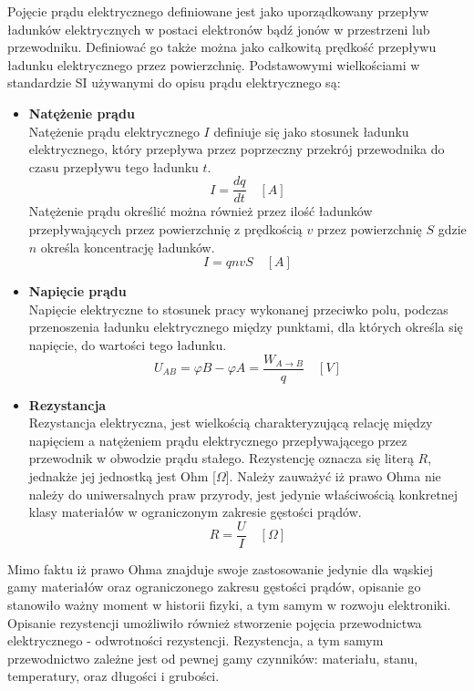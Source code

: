 \documentclass[,a4paper,12pt]{article}
\renewcommand{\cite}{\supercite}
\begin{document}
Pojęcie prądu elektrycznego definiowane jest jako uporządkowany przepływ ładunków elektrycznych w postaci elektronów bądź jonów w przestrzeni lub przewodniku. Definiować go także można jako całkowitą prędkość przepływu ładunku elektrycznego przez powierzchnię\cite{walker2014}. Podstawowymi wielkościami w standardzie SI używanymi do opisu prądu elektrycznego są:
\begin{itemize}
    \item \textbf{Natężenie prądu}\\
    Natężenie prądu elektrycznego $I$ definiuje się jako stosunek ładunku elektrycznego, który przepływa przez poprzeczny przekrój przewodnika do czasu przepływu tego ładunku $t$.\\ 
    \begin{equation}
        I=\frac{dq}{dt}\quad[A]
    \end{equation}
    Natężenie prądu określić można również przez ilość ładunków przepływających przez powierzchnię z prędkością $v$ przez powierzchnię $S$ gdzie $n$ określa koncentrację ładunków\cite{bolkowski1986}.
    \begin{equation}
        I=qnvS\quad [A]
    \end{equation}
    \item \textbf{Napięcie prądu}\\
    Napięcie elektryczne to stosunek pracy wykonanej przeciwko polu, podczas przenoszenia ładunku elektrycznego między punktami, dla których określa się napięcie, do wartości tego ładunku\cite{bolkowski1986}.
    \begin{equation}
        U_{AB}=\varphi B - \varphi A = \frac{W_{A\rightarrow B}}{q}\quad[V]
    \end{equation}
    \item \textbf{Rezystancja}\\
    Rezystancja elektryczna, jest wielkością charakteryzującą relację między napięciem a natężeniem prądu elektrycznego przepływającego przez przewodnik w obwodzie prądu stałego. Rezystencję oznacza się literą $R$, jednakże jej jednostką jest Ohm [$\Omega$]. Należy zauważyć iż prawo Ohma nie należy do uniwersalnych praw przyrody, jest jedynie właściwością konkretnej klasy materiałów w ograniczonym zakresie gęstości prądów.
    \begin{equation}
        R = \frac{U}{I}\quad[\Omega]
    \end{equation}
\end{itemize}\par
Mimo faktu iż prawo Ohma znajduje swoje zastosowanie jedynie dla wąskiej gamy materiałów oraz ograniczonego zakresu gęstości prądów, opisanie go stanowiło ważny moment w historii fizyki, a tym samym w rozwoju elektroniki. Opisanie rezystencji umożliwiło również stworzenie pojęcia przewodnictwa elektrycznego - odwrotności rezystencji. Rezystencja, a tym samym przewodnictwo zależne jest od pewnej gamy czynników: materiału, stanu, temperatury, oraz długości i grubości.\\ \par
\end{document}
